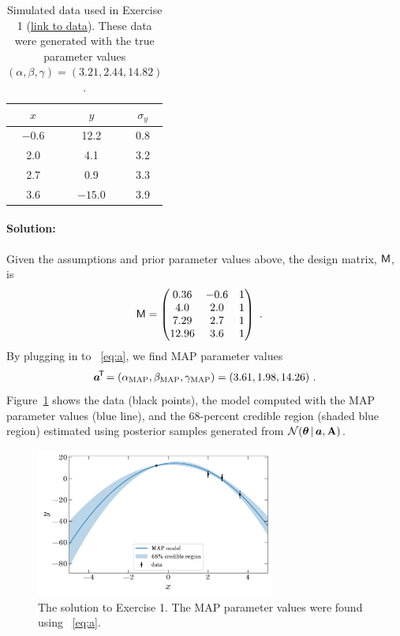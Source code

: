 \begin{table}[t!]
  \footnotesize
  \begin{center}
    \begin{tabular}{c|c|c}
      $x$ & $y$ & $\sigma_y$ \\
      \hline
      $-0.6$ & 12.2 & 0.8 \\
      2.0 & 4.1 & 3.2 \\
      2.7 & 0.9 & 3.3 \\
      3.6 & $-15.0$ & 3.9 \\
    \end{tabular}
    \caption{Simulated data used in Exercise 1
    (\href{https://raw.githubusercontent.com/davidwhogg/GaussianProductRefactor/master/notebooks/data1.csv}{link to data}).
    These data were generated with the true parameter values $(\alpha, \beta, \gamma) = (3.21, 2.44, 14.82)$.
    \label{tbl:data1}}
  \end{center}
\end{table}

\paragraph{Solution:} Given the assumptions and prior parameter values
above, the design matrix, $\mathsf{M}$, is
\begin{align}
  \mathsf{M} &= \begin{pmatrix}
      0.36 & -0.6 & 1\\
      4.0 & 2.0 & 1\\
      7.29 & 2.7 & 1\\
      12.96 & 3.6 & 1
    \end{pmatrix} ~ .
\end{align}
By plugging in to \equationname~\ref{eq:a}, we find MAP parameter values
\begin{equation}
  \boldsymbol{a}^{\!\mathsf{T}\!} =
    (\alpha_{\rm MAP}, \beta_{\rm MAP}, \gamma_{\rm MAP}) =
      (3.61, 1.98, 14.26) ~ .
\end{equation}
Figure~\ref{fig:ex1} shows the data (black points), the model computed with the
MAP parameter values (blue line), and the 68-percent credible region (shaded blue
region) estimated using posterior samples generated from
$\mathcal{N}\!\,(\boldsymbol{\theta}\,|\,\boldsymbol{a},\mathbf{A})$.

\begin{figure}[t]
  \centering
  \includegraphics[width=0.7\textwidth]{exercise1.pdf}
  \caption{The solution to Exercise 1. The MAP parameter values were found using
  \equationname~\ref{eq:a}.}
  \label{fig:ex1}
\end{figure}

